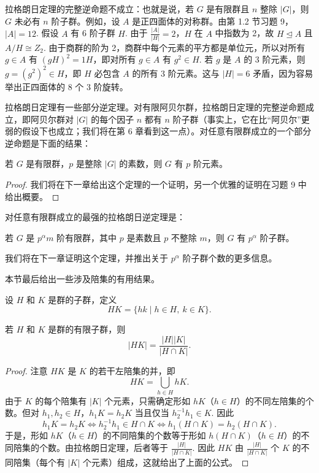 拉格朗日定理的完整逆命题不成立：也就是说，若 \(G\) 是有限群且 \(n\) 整除 \(|G|\)，则 \(G\) 未必有 \(n\) 阶子群。例如，设 \(A\) 是正四面体的对称群。由第 1.2 节习题 9，\(|A| = 12\). 假设 \(A\) 有 6 阶子群 \(H\). 由于 \(\frac{|A|}{|H|} = 2\)，\(H\) 在 \(A\) 中指数为 2，故 \(H \trianglelefteq A\) 且 \(A/H \cong Z_2\). 由于商群的阶为 2，商群中每个元素的平方都是单位元，所以对所有 \(g \in A\) 有 \((gH)^2 = 1H\)，即对所有 \(g \in A\) 有 \(g^2 \in H\). 若 \(g\) 是 \(A\) 的 3 阶元素，则 \(g = (g^2)^2 \in H\)，即 \(H\) 必包含 \(A\) 的所有 3 阶元素。这与 \(|H| = 6\) 矛盾，因为容易举出正四面体的 8 个 3 阶旋转。

拉格朗日定理有一些部分逆定理。对有限阿贝尔群，拉格朗日定理的完整逆命题成立，即阿贝尔群对 \(|G|\) 的每个因子 \(n\) 都有 \(n\) 阶子群（事实上，它在比“阿贝尔”更弱的假设下也成立；我们将在第 6 章看到这一点）。对任意有限群成立的一个部分逆命题是下面的结果：

\begin{theorem}[柯西定理]\label{thm:3.11}
若 \(G\) 是有限群，\(p\) 是整除 \(|G|\) 的素数，则 \(G\) 有 \(p\) 阶元素。
\end{theorem}

\begin{proof}
我们将在下一章给出这个定理的一个证明，另一个优雅的证明在习题 9 中给出概要。
\end{proof}

对任意有限群成立的最强的拉格朗日逆定理是：

\begin{theorem}[西罗定理]\label{thm:3.12}
若 \(G\) 是 \(p^\alpha m\) 阶有限群，其中 \(p\) 是素数且 \(p\) 不整除 \(m\)，则 \(G\) 有 \(p^\alpha\) 阶子群。
\end{theorem}

我们将在下一章证明这个定理，并推出关于 \(p^\alpha\) 阶子群个数的更多信息。

本节最后给出一些涉及陪集的有用结果。

\begin{definition}
设 \(H\) 和 \(K\) 是群的子群，定义
\[
HK = \{hk \mid h \in H,\ k \in K\}.
\]
\end{definition}

\begin{proposition}\label{pro:3.13}
若 \(H\) 和 \(K\) 是群的有限子群，则
\[
|HK| = \frac{|H||K|}{|H \cap K|}.
\]
\end{proposition}

\begin{proof}
注意 \(HK\) 是 \(K\) 的若干左陪集的并，即
\[
HK = \bigcup_{h \in H} hK.
\]
由于 \(K\) 的每个陪集有 \(|K|\) 个元素，只需确定形如 \(hK\)（\(h \in H\)）的不同左陪集的个数。但对 \(h_1, h_2 \in H\)，\(h_1 K = h_2 K\) 当且仅当 \(h_2^{-1}h_1 \in K\). 因此
\[
h_1 K = h_2 K \iff h_2^{-1}h_1 \in H \cap K \iff h_1(H \cap K) = h_2(H \cap K).
\]
于是，形如 \(hK\)（\(h \in H\)）的不同陪集的个数等于形如 \(h(H \cap K)\)（\(h \in H\)）的不同陪集的个数。由拉格朗日定理，后者等于 \(\frac{|H|}{|H \cap K|}\). 因此 \(HK\) 由 \(\frac{|H|}{|H \cap K|}\) 个 \(K\) 的不同陪集（每个有 \(|K|\) 个元素）组成，这就给出了上面的公式。
\end{proof}


